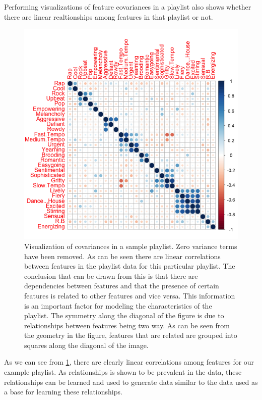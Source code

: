 \documentclass[a4paper,11pt]{kth-mag}
\begin{document}
Performing visualizations of feature covariances in a playlist also shows whether there are linear realtionships among features in that playlist or not.

\begin{figure}
\includegraphics[scale=0.6]{images/0removedPlistFeaturePlot.png}
\caption{Visualization of covariances in a sample playlist. Zero variance terms have been removed. As can be seen there are linear correlations between features in the playlist data for this particular playlist. The conclusion that can be drawn from this is that there are dependencies between features and that the presence of certain features is related to other features and vice versa. This information is an important factor for modeling the characteristics of the playlist. The symmetry along the diagonal of the figure is due to relationships between features being two way. As can be seen from the geometry in the figure, features that are related are grouped into squares along the diagonal of the image.}

\label{plistCorrs}

\end{figure}


As we can see from \ref{plistCorrs}, there are clearly linear correlations among features for our example playlist. As relationships is shown to be prevalent in the data, these relationships can be learned and used to generate data similar to the data used as a base for learning these relationships.
\end{document}
